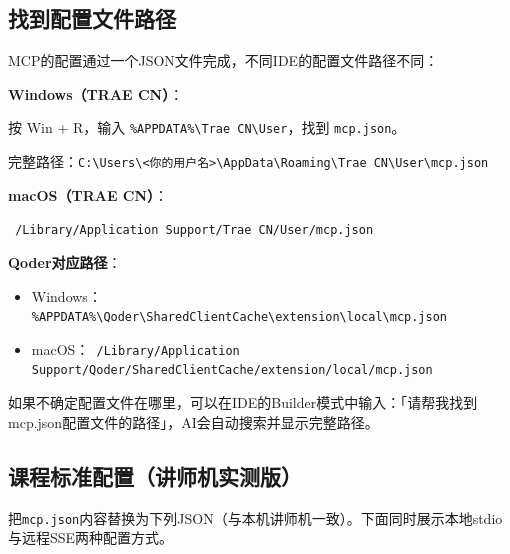 \subsection{找到配置文件路径}

MCP的配置通过一个JSON文件完成，不同IDE的配置文件路径不同：

\textbf{Windows（TRAE CN）}：

按 Win + R，输入 \texttt{\%APPDATA\%\textbackslash Trae CN\textbackslash User}，找到 \texttt{mcp.json}。

完整路径：\texttt{C:\textbackslash Users\textbackslash <你的用户名>\textbackslash AppData\textbackslash Roaming\textbackslash Trae CN\textbackslash User\textbackslash mcp.json}

\textbf{macOS（TRAE CN）}：

\texttt{~/Library/Application Support/Trae CN/User/mcp.json}

\textbf{Qoder对应路径}：

\begin{itemize}[leftmargin=2em]
  \item Windows：\texttt{\%APPDATA\%\textbackslash Qoder\textbackslash SharedClientCache\textbackslash extension\textbackslash local\textbackslash mcp.json}
  \item macOS：\texttt{~/Library/Application Support/Qoder/SharedClientCache/extension/local/mcp.json}
\end{itemize}

\begin{practicebox}[快速定位技巧]
如果不确定配置文件在哪里，可以在IDE的Builder模式中输入：「请帮我找到mcp.json配置文件的路径」，AI会自动搜索并显示完整路径。
\end{practicebox}

\subsection{课程标准配置（讲师机实测版）}

把\texttt{mcp.json}内容替换为下列JSON（与本机讲师机一致）。下面同时展示本地stdio与远程SSE两种配置方式。

